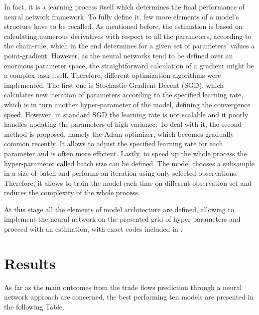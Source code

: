\documentclass{Trade_template}
\numberwithin{equation}{section}
\begin{document}
In fact, it is a learning process itself which determines the final performance of neural network framework. To fully define it, few more elements of a model’s structure have to be recalled. As mentioned before, the estimation is based on calculating numerous derivatives with respect to all the parameters, according to the chain-rule, which in the end determines for a given set of parameters’ values a point-gradient. However, as the neural networks tend to be defined over an enormous parameter space, the straightforward calculation of a gradient might be a complex task itself. Therefore, different optimization algorithms were implemented. The first one is Stochastic Gradient Decent (SGD), which calculates new iteration of parameters according to the specified learning rate, which is in turn another hyper-parameter of the model, defining the convergence speed. However, in standard SGD the learning rate is not scalable and it poorly handles updating the parameters of high variance. To deal with it, the second method is proposed, namely the Adam optimizer, which becomes gradually common recently. It allows to adjust the specified learning rate for each parameter and is often more efficient. Lastly, to speed up the whole process the hyper-parameter called batch size can be defined. The model chooses a subsample in a size of batch and performs an iteration using only selected observations. Therefore, it allows to train the model each time on different observation set and reduces the complexity of the whole process.

At this stage all the elements of model architecture are defined, allowing to implement the neural network on the presented grid of hyper-parameters and proceed with an estimation, with exact codes included in .

\chapter{Results}

As far as the main outcomes from the trade flows prediction through a neural network approach are concerned, the best performing ten models are presented in the following  Table.
\end{document}
